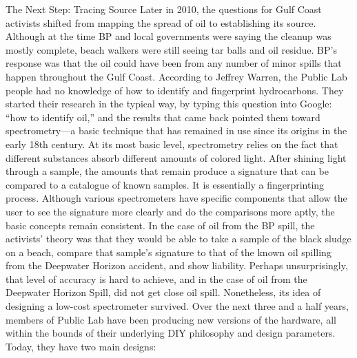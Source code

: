 The Next Step: Tracing Source
Later in 2010, the questions for Gulf Coast activists shifted from mapping
the spread of oil to establishing its source. Although at the time BP and local
governments were saying the cleanup was mostly complete, beach walkers
were still seeing tar balls and oil residue. BP's response was that the oil
could have been from any number of minor spills that happen throughout
the Gulf Coast.
According to Jeffrey Warren, the Public Lab people had no knowledge of
how to identify and fingerprint hydrocarbons. They started their research
in the typical way, by typing this question into Google: ``how to identify
oil,'' and the results that came back pointed them toward spectrometry—a
basic technique that has remained in use since its origins in the early 18th
century.
At its most basic level, spectrometry relies on the fact that different substances
absorb different amounts of colored light. After shining light
through a sample, the amounts that remain produce a signature that can be
compared to a catalogue of known samples. It is essentially a fingerprinting
process. Although various spectrometers have specific components that
allow the user to see the signature more clearly and do the comparisons
more aptly, the basic concepts remain consistent.
In the case of oil from the BP spill, the activists' theory was that they would
be able to take a sample of the black sludge on a beach, compare that sample's
signature to that of the known oil spilling from the Deepwater Horizon
accident, and show liability.
Perhaps unsurprisingly, that level of accuracy is hard to achieve, and in the
case of oil from the Deepwater Horizon Spill, did not get close oil spill.
Nonetheless, its idea of designing a low-cost spectrometer survived. Over
the next three and a half years, members of Public Lab have been producing
new versions of the hardware, all within the bounds of their underlying
DIY philosophy and design parameters. Today, they have two main designs:

